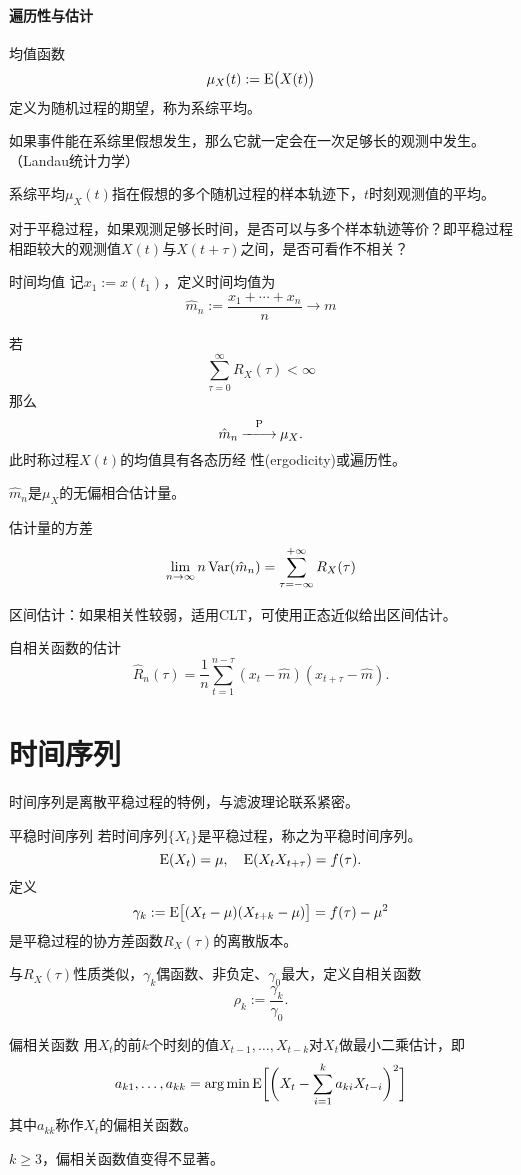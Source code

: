 \paragraph{遍历性与估计}
均值函数
\[
	\mu_X(t):=\operatorname{E}\bigl(X(t)\bigr)
\]
定义为随机过程的期望，称为系综平均。
\begin{compactitem}
	\item 如果事件能在系综里假想发生，那么它就一定会在一次足够长的观测中发生。（Landau统计力学）
	\item 系综平均$\mu_X(t)$指在假想的多个随机过程的样本轨迹下，$t $时刻观测值的平均。
	\item 对于平稳过程，如果观测足够长时间，是否可以与多个样本轨迹等价？即平稳过程相距较大的观测值$ X(t) $与$ X(t + \tau) $之间，是否可看作不相关？
\end{compactitem}
\begin{definition}{时间均值}{}
	记$x_1:=x(t_1)$，定义时间均值为
	\[
		\hat m_n:=\frac{x_1+\cdots+x_n}n\to m
	\]
\end{definition}
若
\[
	\sum_{\tau=0}^\infty R_X(\tau)<\infty
\]
那么
\[
	\hat m_n\overset{\operatorname{P}}{-\hspace{-4pt}-\hspace{-5pt}\longrightarrow}\mu_X.
\]
此时称过程$ X(t) $的均值具有各态历经
性(ergodicity)或遍历性。
\begin{compactitem}
	\item $\hat m_n$是$\mu_X$的无偏相合估计量。
	\item 估计量的方差\[
		\lim_{n\to\infty}n\operatorname{Var}(\hat m_n)=\sum_{\tau=-\infty}^{+\infty}R_X(\tau)
	\]
\end{compactitem}
区间估计：如果相关性较弱，适用CLT，可使用正态近似给出区间估计。

自相关函数的估计
\[
	\hat R_n(\tau)=\frac1n\sum_{t=1}^{n-\tau}(x_t-\hat m)(x_{t+\tau}-\hat m).
\]
\section{时间序列}
时间序列是离散平稳过程的特例，与滤波理论联系紧密。
\begin{definition}{平稳时间序列}{}
	若时间序列$\{X_t\}$是平稳过程，称之为平稳时间序列。
	\[
		\operatorname{E}(X_t)=\mu,\quad\operatorname{E}(X_tX_{t+\tau})=f(\tau).
	\]
	定义
	\[
		\gamma_k:=\operatorname{E}\bigl[(X_t-\mu)(X_{t+k}-\mu)\bigr]=f(\tau)-\mu^2
	\]
	是平稳过程的协方差函数$R_X(\tau)$的离散版本。
\end{definition}
与$R_X(\tau)$性质类似，$\gamma_k$偶函数、非负定、$\gamma_0$最大，定义自相关函数
\[
	\rho_k:=\frac{\gamma_k}{\gamma_0}.
\]
\begin{definition}{偏相关函数}{}
	用$X_t$的前$ k $个时刻的值$X_{t-1},\ldots,X_{t-k}$对$ X_t $做最小二乘估计，即
	\[
		a_{k1},\ldots,a_{kk}=\arg\min\operatorname{E}\biggl[\biggl(X_t-\sum_{i=1}^ka_{ki}X_{t-i}\biggr)^2\biggr]
	\]
	其中$a_{kk}$称作$X_t$的偏相关函数。
\end{definition}
$k\geqslant 3$，偏相关函数值变得不显著。
